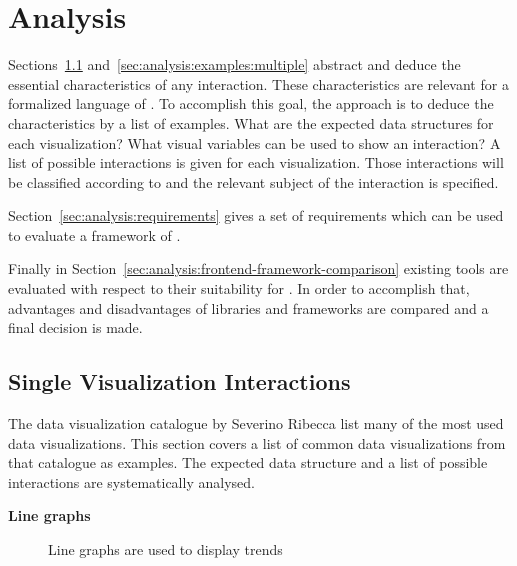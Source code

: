 \chapter{Analysis}\label{sec:analysis}
Sections~\ref{sec:analysis:examples:single} and~\ref{sec:analysis:examples:multiple} abstract and deduce the essential characteristics of any interaction.
These characteristics are relevant for a formalized language of \cmvs{}.
To accomplish this goal, the approach is to deduce the characteristics by a list of examples.
What are the expected data structures for each visualization?
What visual variables can be used to show an interaction?
A list of possible interactions is given for each visualization.
Those interactions will be classified according to \textcite{Yi2007} and the relevant subject of the interaction is specified.

Section~\ref{sec:analysis:requirements} gives a set of requirements which can be used to evaluate a framework of \cmvs{}.

Finally in Section~\ref{sec:analysis:frontend-framework-comparison} existing tools are evaluated with respect to their suitability for \cmvs{}.
In order to accomplish that, advantages and disadvantages of libraries and frameworks are compared and a final decision is made.

\section{Single Visualization Interactions}\label{sec:analysis:examples:single}

The data visualization catalogue by Severino Ribecca list many of the most used data visualizations\cite{VisualizationCatalogue2017}.
This section covers a list of common data visualizations from that catalogue as examples.
The expected data structure and a list of possible interactions are systematically analysed.

\textbf{Line graphs}
\begin{figure}
  \begin{center}
    \qquad
  \end{center}
  \caption{Line graphs are used to display trends}
  \label{fig:analysis:line-graphs}
\end{figure}

